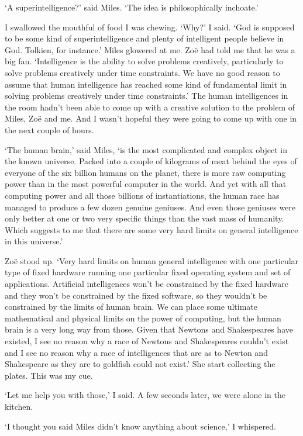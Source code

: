 `A superintelligence?' said Miles. `The idea is philosophically
inchoate.'

I swallowed the mouthful of food I was chewing. `Why?' I said. `God
is supposed to be some kind of superintelligence and plenty of
intelligent people believe in God. Tolkien, for instance.' Miles
glowered at me. Zoë had told me that he was a big fan.
`Intelligence is the ability to solve problems creatively,
particularly to solve problems creatively under time constraints. We
have no good reason to assume that human intelligence has reached
some kind of fundamental limit in solving problems creatively under
time constraints.' The human intelligences in the room hadn't been
able to come up with a creative solution to the problem of Miles,
Zoë and me. And I wasn't hopeful they were going to come up with
one in the next couple of hours.

`The human brain,' said Miles, `is the most complicated and complex
object in the known universe. Packed into a couple of kilograms of
meat behind the eyes of everyone of the six billion humans on the
planet, there is more raw computing power than in the most powerful
computer in the world. And yet with all that computing power and all
those billions of instantiations, the human race has managed to
produce a few dozen genuine geniuses. And even those geniuses were
only better at one or two very specific things than the vast mass of
humanity. Which suggests to me that there {\twelveit are\/} some
very hard limits on general intelligence in this universe.'

Zoë stood up. `Very hard limits on {\twelveit human\/} general
intelligence with one particular type of fixed hardware running one
particular fixed operating system and set of applications.
Artificial intelligences won't be constrained by the fixed hardware
and they won't be constrained by the fixed software, so they
wouldn't be constrained by the limits of human brain. We can place
some ultimate mathematical and physical limits on the power of
computing, but the human brain is a very long way from those. Given
that Newtons and Shakespeares have existed, I see no reason why a
race of Newtons and Shakespeares couldn't exist and I see no reason
why a race of intelligences that are as to Newton and Shakespeare as
they are to goldfish could not exist.' She start collecting the
plates. This was my cue.

`Let me help you with those,' I said. A few seconds later, we were
alone in the kitchen.

`I thought you said Miles didn't know anything about science,' I
whispered.

